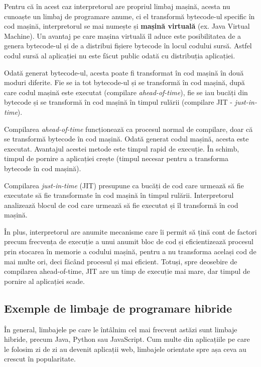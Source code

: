 Pentru că în acest caz interpretorul are propriul limbaj mașină, acesta nu cunoaște
un limbaj de programare anume, ci el transformă bytecode-ul specific în cod
mașină, interpretorul se mai numește și \textbf{mașină virtuală} (ex. Java Virtual
Machine). Un avantaj pe care mașina virtuală îl aduce este posibilitatea de a
genera bytecode-ul și de a distribui fișiere bytecode în locul codului sursă.
Astfel codul sursă al aplicației nu este făcut public odată cu distribuția
aplicației.

Odată generat bytecode-ul, acesta poate fi transformat în cod mașină în două
moduri diferite. Fie se ia tot bytecode-ul și se transformă în cod mașină, după
care codul mașină este executat (compilare \textit{ahead-of-time}), fie se iau bucăți din
bytecode și se transformă în cod mașină în timpul rulării (compilare
JIT - \textit{just-in-time}).

Compilarea \textit{ahead-of-time} funcționează ca procesul normal de compilare, doar că
se transformă bytecode în cod mașină. Odată generat codul mașină, acesta este
executat. Avantajul acestei metode este timpul rapid de execuție. În schimb,
timpul de pornire a aplicației crește (timpul necesar pentru a transforma
bytecode în cod mașină).

Compilarea \textit{just-in-time} (JIT) presupune ca bucăți de cod care urmează să fie executate
să fie transformate în cod mașină în timpul rulării. Interpretorul analizează
blocul de cod care urmează să fie executat și îl transformă în cod mașină.

În plus, interpretorul are anumite mecanisme care îi permit să țină cont de
factori precum frecvența de execuție a unui anumit bloc de cod și eficientizează
procesul prin stocarea în memorie a codului mașină, pentru a nu transforma
același cod de mai multe ori, deci făcând procesul și mai eficient. Totuși, spre
deosebire de compilarea ahead-of-time, JIT are un
timp de execuție mai mare, dar timpul de pornire al aplicației scade.

\subsection{Exemple de limbaje de programare hibride}
\label{sec:appdev:hybrid-lang:ex}

În general, limbajele pe care le întâlnim cel mai frecvent astăzi sunt limbaje
hibride, precum Java, Python sau JavaScript. Cum multe din aplicațiile pe care
le folosim zi de zi au devenit aplicații web, limbajele orientate spre așa ceva
au crescut în popularitate.


